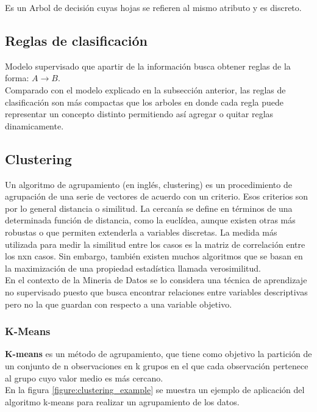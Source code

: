 \documentclass[osajnl,twocolumn,showpacs,superscriptaddress,10pt,floatfix]{revtex4-1} %
\begin{document}
Es un Arbol de decisión cuyas hojas se refieren al mismo atributo y es discreto.

\subsection{Reglas de clasificación}

Modelo supervisado que apartir de la información busca obtener reglas de la forma: $ A \rightarrow B $. \\

Comparado con el modelo explicado en la subsección anterior, las reglas de clasificación son más compactas que los arboles en donde cada regla puede representar un concepto distinto permitiendo así agregar o quitar reglas dinamicamente.

\subsection{Clustering}

Un algoritmo de agrupamiento (en inglés, clustering) es un procedimiento de agrupación de una serie de vectores de acuerdo con un criterio. Esos criterios son por lo general distancia o similitud. La cercanía se define en términos de una determinada función de distancia, como la euclídea, aunque existen otras más robustas o que permiten extenderla a variables discretas. La medida más utilizada para medir la similitud entre los casos es la matriz de correlación entre los nxn casos. Sin embargo, también existen muchos algoritmos que se basan en la maximización de una propiedad estadística llamada verosimilitud. \\

En el contexto de la Mineria de Datos se lo considera una técnica de aprendizaje no supervisado puesto que busca encontrar relaciones entre variables descriptivas pero no la que guardan con respecto a una variable objetivo. \\

\subsubsection{K-Means}

\textbf{K-means} es un método de agrupamiento, que tiene como objetivo la partición de un conjunto de n observaciones en k grupos en el que cada observación pertenece al grupo cuyo valor medio es más cercano. \\

En la figura \ref{figure:clustering_example} se muestra un ejemplo de aplicación del algoritmo k-means para realizar un agrupamiento de los datos.
\end{document}

